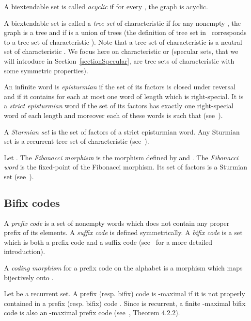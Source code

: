 \documentclass[preprint,12pt]{elsarticle}
\numberwithin{theorem}{section}
\numberwithin{equation}{section}
\numberwithin{figure}{section}
\numberwithin{table}{section}
\begin{document}
A biextendable set  is called \emph{acyclic} if for every , the graph  is acyclic.

A biextendable set  is called a \emph{tree set} of characteristic  if for any nonempty , the graph  is a tree and if  is a union of  trees (the definition of tree set in~\cite{BertheDeFeliceDolceLeroyPerrinReutenauerRindone2013a} corresponds to a tree set of characteristic ).
Note that a tree set of characteristic  is a neutral set of characteristic . We focus here on characteristic  or  (specular sets, that we will introduce in Section~\ref{sectionSpecular}, are tree sets of characteristic  with some symmetric properties).


An infinite word is \emph{episturmian} if the set of its factors is closed under reversal and if it contains for each  at most one word of length  which is right-special.
It is a \emph{strict episturmian} word if the set of its factors has exactly one right-special word of each length and moreover each of these words  is such that  (see~\cite{BerstelDeFelicePerrinReutenauerRindone2012}).

A \emph{Sturmian set} is the set of factors of a strict episturmian word.
Any Sturmian set is a recurrent tree set of characteristic  (see~\cite{BertheDeFeliceDolceLeroyPerrinReutenauerRindone2013a}). 

\begin{example}
\label{exampleFibo}
Let . The \emph{Fibonacci morphism} is the morphism  defined by  and .
The \emph{Fibonacci word} is the fixed-point  of the Fibonacci morphism.
Its set of factors is a Sturmian set (see~\cite{Lothaire2002}).
\end{example}





\subsection{Bifix codes}
\label{sectionBifix}

A \emph{prefix code} is a set of nonempty words which does not contain any
proper prefix of its elements. A \emph{suffix code} is defined symmetrically.
A \emph{bifix code} is a set which is both a prefix code and a suffix code
(see~\cite{BerstelPerrinReutenauer2009} for a more detailed introduction).

A \emph{coding morphism} for a prefix code  on the alphabet 
is a morphism  which maps bijectively  onto .

Let  be a recurrent set.
A prefix (resp. bifix) code  is -maximal if it is not properly contained
in a prefix (resp. bifix) code . 
Since  is recurrent, a finite -maximal bifix code is also an
-maximal prefix code 
(see~\cite{BerstelDeFelicePerrinReutenauerRindone2012}, Theorem 4.2.2).
\end{document}
